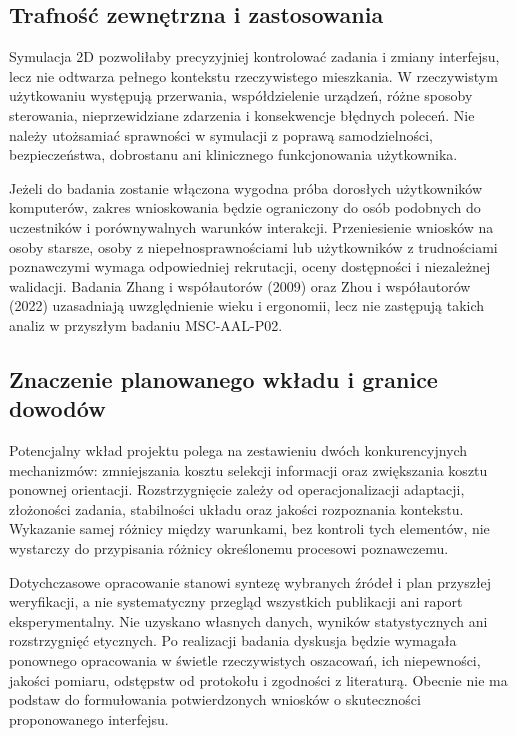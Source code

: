 \documentclass[11pt,a4paper]{article}
\begin{document}
\subsection{Trafność zewnętrzna i zastosowania}

Symulacja 2D pozwoliłaby precyzyjniej kontrolować zadania i zmiany interfejsu, lecz nie odtwarza pełnego kontekstu rzeczywistego mieszkania. W rzeczywistym użytkowaniu występują przerwania, współdzielenie urządzeń, różne sposoby sterowania, nieprzewidziane zdarzenia i konsekwencje błędnych poleceń. Nie należy utożsamiać sprawności w symulacji z poprawą samodzielności, bezpieczeństwa, dobrostanu ani klinicznego funkcjonowania użytkownika.

Jeżeli do badania zostanie włączona wygodna próba dorosłych użytkowników komputerów, zakres wnioskowania będzie ograniczony do osób podobnych do uczestników i porównywalnych warunków interakcji. Przeniesienie wniosków na osoby starsze, osoby z niepełnosprawnościami lub użytkowników z trudnościami poznawczymi wymaga odpowiedniej rekrutacji, oceny dostępności i niezależnej walidacji. Badania Zhang i współautorów (2009) oraz Zhou i współautorów (2022) uzasadniają uwzględnienie wieku i ergonomii, lecz nie zastępują takich analiz w przyszłym badaniu MSC-AAL-P02.

\subsection{Znaczenie planowanego wkładu i granice dowodów}

Potencjalny wkład projektu polega na zestawieniu dwóch konkurencyjnych mechanizmów: zmniejszania kosztu selekcji informacji oraz zwiększania kosztu ponownej orientacji. Rozstrzygnięcie zależy od operacjonalizacji adaptacji, złożoności zadania, stabilności układu oraz jakości rozpoznania kontekstu. Wykazanie samej różnicy między warunkami, bez kontroli tych elementów, nie wystarczy do przypisania różnicy określonemu procesowi poznawczemu.

Dotychczasowe opracowanie stanowi syntezę wybranych źródeł i plan przyszłej weryfikacji, a nie systematyczny przegląd wszystkich publikacji ani raport eksperymentalny. Nie uzyskano własnych danych, wyników statystycznych ani rozstrzygnięć etycznych. Po realizacji badania dyskusja będzie wymagała ponownego opracowania w świetle rzeczywistych oszacowań, ich niepewności, jakości pomiaru, odstępstw od protokołu i zgodności z literaturą. Obecnie nie ma podstaw do formułowania potwierdzonych wniosków o skuteczności proponowanego interfejsu.
\end{document}
